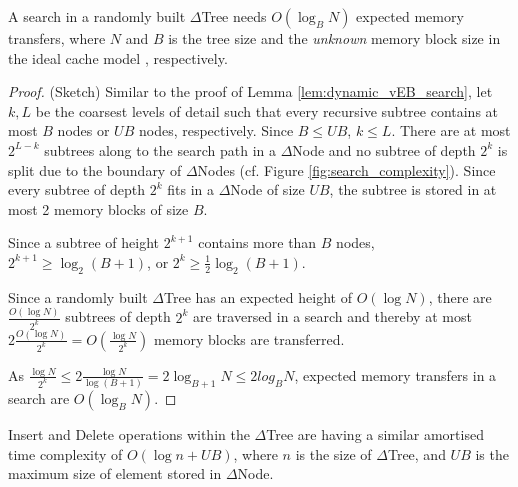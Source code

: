 \begin{lemma}
A search in a randomly built $\Delta$Tree needs $O(\log_B N)$ expected memory
transfers, where $N$ and $B$ is the tree size and the {\em unknown} memory
block size in the ideal cache model \cite{Frigo:1999:CA:795665.796479}, 
respectively. 
\label{lem:DeltaTree_search}
\end{lemma}
\begin{proof}(Sketch)
Similar to the proof of Lemma \ref{lem:dynamic_vEB_search}, let $k, L$ be the
coarsest levels of detail such that every recursive subtree contains at most
$B$ nodes or $UB$ nodes, respectively. Since $B \leq UB$, $k \leq L$. There are
at most $2^{L-k}$ subtrees along to the search path in a $\Delta$Node and no
subtree of depth $2^k$ is split due to the boundary of $\Delta$Nodes (cf. Figure
\ref{fig:search_complexity}). Since every subtree of depth $2^k$ fits in a
$\Delta$Node of size $UB$, the subtree is stored in at most 2 memory blocks of
size $B$.

Since a subtree of height $2^{k+1}$ contains more than $B$ nodes, 
$2^{k+1} \geq \log_2 (B + 1)$, or $2^{k} \geq \frac{1}{2} \log_2 (B+ 1)$. 

Since a randomly built $\Delta$Tree has an expected height of $O(\log N)$, there
are $\frac{O(\log N)}{2^k}$ subtrees of depth $2^k$ are traversed in a search and
thereby at most  $2  \frac{O(\log N)}{2^k} = O(\frac{\log N}{2^k})$ memory
blocks are transferred.

As $\frac{\log N}{2^k} \leq 2\frac{\log N}{\log (B+ 1)} = 2 \log_{B+1} N \leq 2
log_B N$, expected memory transfers in a search are $O(\log_B N)$.
\end{proof}

\begin{lemma}
Insert and Delete operations within the $\Delta$Tree are having a similar 
amortised time complexity of $O(\log n + UB)$, where $n$ is the size of $\Delta$Tree,
and $UB$ is the maximum size of element stored in $\Delta$Node.
\label{lem:amortised_cost}
\end{lemma}


